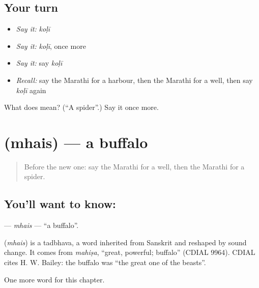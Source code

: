 \subsection*{Your turn}
\begin{itemize}
\raggedright
  \item \emph{Say it:} \emph{koḷī}
  \item \emph{Say it:} \emph{koḷī}, once more
  \item \emph{Say it:} say \emph{koḷī}
  \item \emph{Recall:} say the Marathi for a harbour, then the Marathi for a well, then say \emph{koḷī} again
\end{itemize}

\begin{tcolorbox}[breakable,colback=teal!4,colframe=teal!35!black,title={Before you move on}]
What does  mean? (\textquotedblleft{}A spider\textquotedblright{}.) Say it once more.
\end{tcolorbox}
\section[\texorpdfstring{\mr{म्हैस} (mhais)}{म्हैस (mhais)}]{ (mhais) — a buffalo}

\label{lesson:MR-C218-mhais}



\begin{quote}
Before the new one: say the Marathi for a well, then the Marathi for a spider.
\end{quote}

\subsection*{You'll want to know: }
\textbf{} — \emph{mhais} — \textquotedblleft{}a buffalo\textquotedblright{}.

\begin{cousinweb}
\textbf{} (\emph{mhais}) is a tadbhava, a word inherited from Sanskrit and reshaped by sound change. It comes from \emph{mahiṣa}, \textquotedblleft{}great, powerful; buffalo\textquotedblright{} (CDIAL 9964). CDIAL cites H. W. Bailey: the buffalo was \textquotedblleft{}the great one of the beasts\textquotedblright{}.
\end{cousinweb}

\begin{grammarlens}[title={What you've built}]
One more word for this chapter.
\end{grammarlens}

